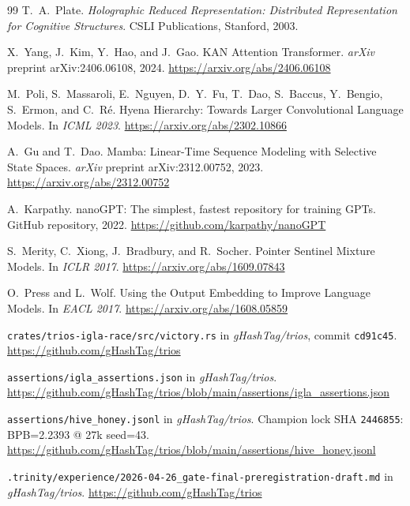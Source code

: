 \begin{thebibliography}{99}
  T.~A.~Plate.
  \textit{Holographic Reduced Representation: Distributed Representation for
  Cognitive Structures}.
  CSLI Publications, Stanford, 2003.

  X.~Yang, J.~Kim, Y.~Hao, and J.~Gao.
  KAN Attention Transformer.
  \textit{arXiv} preprint arXiv:2406.06108, 2024.
  \url{https://arxiv.org/abs/2406.06108}

  M.~Poli, S.~Massaroli, E.~Nguyen, D.~Y.~Fu, T.~Dao, S.~Baccus,
  Y.~Bengio, S.~Ermon, and C.~R\'{e}.
  Hyena Hierarchy: Towards Larger Convolutional Language Models.
  In \textit{ICML 2023}.
  \url{https://arxiv.org/abs/2302.10866}

  A.~Gu and T.~Dao.
  Mamba: Linear-Time Sequence Modeling with Selective State Spaces.
  \textit{arXiv} preprint arXiv:2312.00752, 2023.
  \url{https://arxiv.org/abs/2312.00752}

  A.~Karpathy.
  nanoGPT: The simplest, fastest repository for training GPTs.
  GitHub repository, 2022.
  \url{https://github.com/karpathy/nanoGPT}

  S.~Merity, C.~Xiong, J.~Bradbury, and R.~Socher.
  Pointer Sentinel Mixture Models.
  In \textit{ICLR 2017}.
  \url{https://arxiv.org/abs/1609.07843}

  O.~Press and L.~Wolf.
  Using the Output Embedding to Improve Language Models.
  In \textit{EACL 2017}.
  \url{https://arxiv.org/abs/1608.05859}

  \texttt{crates/trios-igla-race/src/victory.rs} in \textit{gHashTag/trios},
  commit \texttt{cd91c45}.
  \url{https://github.com/gHashTag/trios}

  \texttt{assertions/igla\_assertions.json} in \textit{gHashTag/trios}.
  \url{https://github.com/gHashTag/trios/blob/main/assertions/igla_assertions.json}

  \texttt{assertions/hive\_honey.jsonl} in \textit{gHashTag/trios}.
  Champion lock SHA \texttt{2446855}: BPB=2.2393 @ 27k seed=43.
  \url{https://github.com/gHashTag/trios/blob/main/assertions/hive_honey.jsonl}

  \texttt{.trinity/experience/2026-04-26\_gate-final-preregistration-draft.md}
  in \textit{gHashTag/trios}.
  \url{https://github.com/gHashTag/trios}


\end{thebibliography}
